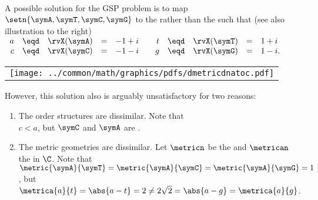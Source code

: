 \begin{tabstr}{0.75}
\begin{example}
\label{ex:gsp_C}
\mbox{}\\\begin{minipage}{\tw-46mm}%
A possible solution for the GSP problem  is to map $\setn{\symA, \symT, \symC, \symG}$
to the   
rather than the   such that (see also illustration to the right)
\\\indentx$\begin{array}{rcrcl@{\qquad}rcrcl}
  a&\eqd&\rvX(\symA) &=& -1+i  & t&\eqd&\rvX(\symT) &=& 1+i\\
  c&\eqd&\rvX(\symC) &=& -1-i  & g&\eqd&\rvX(\symG) &=& 1-i .
\end{array}$
\end{minipage}%
\hfill%
{\begin{tabular}{c}%
  \gsize%
  \psset{unit=5mm}%
  {\texttt{[image: ../common/math/graphics/pdfs/dmetricdnatoc.pdf]}}%
\end{tabular}}
However, this solution also is arguably unsatisfactory for two reasons:
\begin{enumerate}
  \item The order structures are dissimilar. Note that 
        \\\indentx$c<a$, but $\symC$ and $\symA$ are  .
  \item The metric geometries are dissimilar. 
        Let $\metricn$ be the  and $\metrican$ the  in $\C$.
        Note that 
        \\\indentx$\metric{\symA}{\symT} = \metric{\symA}{\symC} = \metric{\symA}{\symG} = 1$, but
        \\\indentx$\metrica{a}{t}=\abs{a-t}=2 \neq 2\sqrt{2}=\abs{a-g}=\metrica{a}{g}$.
\end{enumerate}
\end{example}




\end{tabstr}
